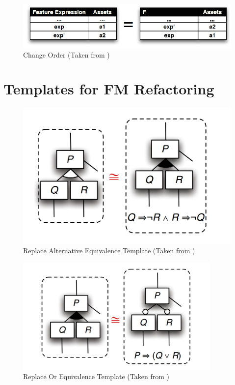 \documentclass[12pt]{article}
\begin{document}
\begin{figure}[H]
\centering
\includegraphics[width=1\textwidth, frame]{images/ChangeOrder}
\caption{Change Order (Taken from \cite{msclmt})}
\end{figure}

\pagebreak
\section{Templates for FM Refactoring}

\begin{figure}[H]
\centering
\includegraphics[width=1\textwidth, frame]{images/ReplaceAlternative}
\caption{Replace Alternative Equivalence Template (Taken from \cite{gttse})}
\end{figure}

\begin{figure}[H]
\centering
\includegraphics[width=0.9\textwidth, frame]{images/ReplaceOr}
\caption{Replace Or Equivalence Template (Taken from \cite{gttse})}
\end{figure}
\end{document}
